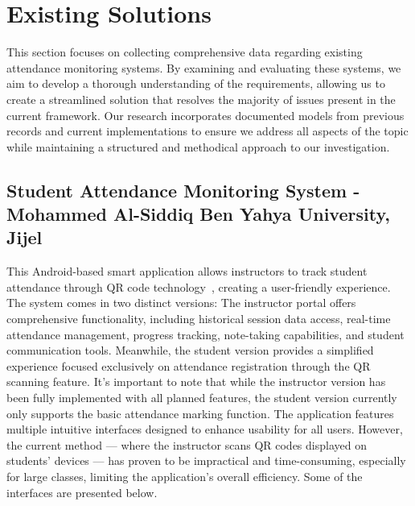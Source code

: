 \documentclass[12pt,a4paper]{report}
\begin{document}
\section{Existing Solutions}
This section focuses on collecting comprehensive data regarding existing attendance monitoring systems. By examining and evaluating these systems, we aim to develop a thorough understanding of the requirements, allowing us to create a streamlined solution that resolves the majority of issues present in the current framework. Our research incorporates documented models from previous records and current implementations to ensure we address all aspects of the topic while maintaining a structured and methodical approach to our investigation.
\vspace{5cm}
\subsection{Student Attendance Monitoring System - Mohammed Al-Siddiq Ben Yahya University, Jijel}
This Android-based smart application allows instructors to track student attendance through QR code technology~\cite{rayane2022}, creating a user-friendly experience. The system comes in two distinct versions:
The instructor portal offers comprehensive functionality, including historical session data access, real-time attendance management, progress tracking, note-taking capabilities, and student communication tools. Meanwhile, the student version provides a simplified experience focused exclusively on attendance registration through the QR scanning feature.
It's important to note that while the instructor version has been fully implemented with all planned features, the student version currently only supports the basic attendance marking function. The application features multiple intuitive interfaces designed to enhance usability for all users. However, the current method — where the instructor scans QR codes displayed on students' devices — has proven to be impractical and time-consuming, especially for large classes, limiting the application's overall efficiency.
Some of the interfaces are presented below.
\end{document}
